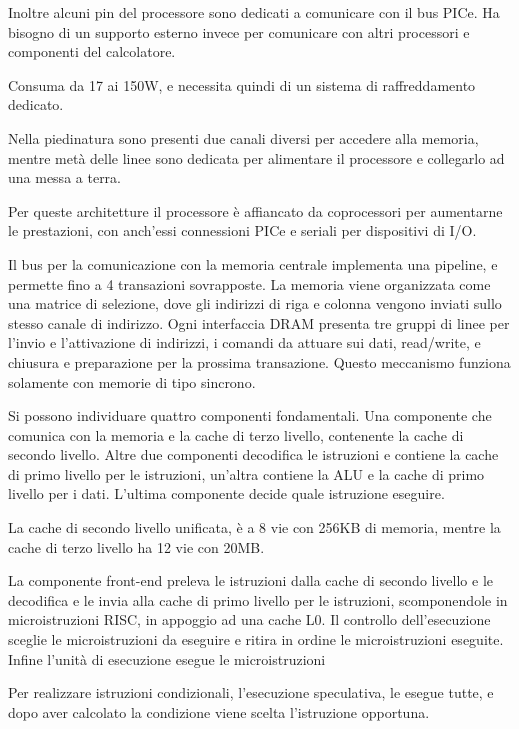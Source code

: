 \documentclass{article}
\numberwithin{equation}{subsection}
\begin{document}
Inoltre alcuni pin del processore sono dedicati a comunicare con il bus PICe. Ha bisogno di un supporto esterno invece per comunicare con altri processori e componenti del 
calcolatore. 

Consuma da 17 ai 150W, e necessita quindi di un sistema di raffreddamento dedicato. 


Nella piedinatura sono presenti due canali diversi per accedere alla memoria, mentre metà delle linee sono dedicata per alimentare il processore e collegarlo ad una messa a 
terra. 

Per queste architetture il processore è affiancato da coprocessori per aumentarne le prestazioni, con anch'essi connessioni PICe e seriali per dispositivi di I/O.  

Il bus per la comunicazione con la memoria centrale implementa una pipeline, e permette fino a 4 transazioni sovrapposte. 
La memoria viene organizzata come una matrice di selezione, dove gli indirizzi di riga e colonna vengono inviati sullo stesso canale di indirizzo. 
Ogni interfaccia DRAM presenta tre gruppi di linee per l'invio e l'attivazione di indirizzi, i comandi da attuare sui dati, read/write, e chiusura e preparazione per la 
prossima transazione. Questo meccanismo funziona solamente con memorie di tipo sincrono. 

Si possono individuare quattro componenti fondamentali. %
Una componente che comunica con la memoria e la cache di terzo livello, contenente la cache di secondo livello. Altre due componenti decodifica le istruzioni e contiene la 
cache di primo livello per le istruzioni, un'altra contiene la ALU e la cache di primo livello per i dati. L'ultima componente decide quale istruzione eseguire. 

La cache di secondo livello unificata, è a 8 vie con 256KB di memoria, mentre la cache di terzo livello ha 12 vie con 20MB. 

La componente front-end preleva le istruzioni dalla cache di secondo livello e le decodifica e le invia alla cache di primo livello per le istruzioni, scomponendole in 
microistruzioni RISC, in appoggio ad una cache L0. Il controllo dell'esecuzione sceglie le microistruzioni da eseguire e ritira in ordine le microistruzioni eseguite. 
Infine l'unità di esecuzione esegue le microistruzioni %


Per realizzare istruzioni condizionali, l'esecuzione speculativa, le esegue tutte, e dopo aver calcolato la condizione viene scelta l'istruzione opportuna. 
\end{document}
